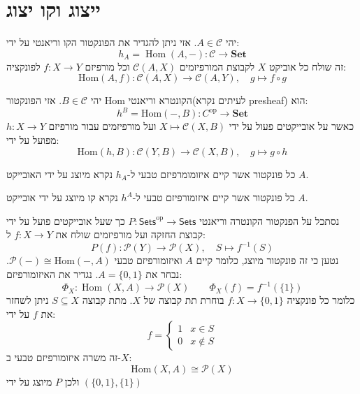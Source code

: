 \documentclass{tstextbook}
\begin{document}
\section{ייצוג וקו יצוג}

\begin{definition}
יהי \(A \in \mathcal{C}\). אזי ניתן להגדיר את הפונקטור הקו וריאנטי על ידי:
$$h_{A}=\operatorname{Hom}(A,-)\colon{\mathcal{C}}\to\mathbf{Set}$$
זה שולח כל אוביקט \(X\) לקבוצת המורפיזמים \(\mathcal{C}(A,X)\) וכל מורפיזם \(f:X\to Y\) לפונקציה:
$$\mathrm{Hom}(A,f)\colon{\mathcal{C}}(A,X)\to{\mathcal{C}}(A,Y),\quad g\mapsto f\circ g$$

\end{definition}
\begin{definition}
יהי \(B \in \mathcal{C}\). אזי הפונקטור Hom הקונטרא וריאנטי(לעיתים נקרא presheaf) הוא:
$$h^{B}=\mathrm{Hom}(-,B)\colon C^{\mathrm{op}}\to\mathbf{Set}$$
כאשר על אובייקטים פעול על ידי \(X\mapsto \mathcal{C}(X,B)\) ועל מורפיזמים עבור מורפיזם \(h:X\to Y\) מפועל על ידי:
$$\mathrm{Hom}(h,B)\colon{\mathcal{C}}(Y,B)\to{\mathcal{C}}(X,B),\quad g\mapsto g\circ h$$

\end{definition}
\begin{proposition}
כל פונקטור אשר קיים איזומומרפיזם טבעי ל-\(h_{A}\) נקרא מיוצג על ידי האובייקט \(A\).

\end{proposition}
\begin{proposition}
כל פונקטור אשר קיים איזומורפיזם טבעי ל-\(h^{A}\) נקרא קו מיוצג על ידי אובייקט \(A\).

\end{proposition}
\begin{example}
נסתכל על הפנקטור הקונטרה וריאנטי \(P:\mathsf{Sets}^{\mathrm{op}}\to \mathsf{Sets}\) כך שעל אובייקטים פועל על ידי קבוצת החזקה ועל מורפיזמים שולח את \(f:X\to Y\) ל:
$$P(f):{\mathcal{P}}(Y)\to{\mathcal{P}}(X),\quad S\mapsto f^{-1}(S)$$
נטען כי זה פונקטור מיוצג, כלומר קיים \(A\) ואיזומורפיזם טבעי \(\mathcal{P}(-)\cong \mathrm{Hom}(-,A)\). נבחר את \(A=\{ 0,1 \}\). נגדיר את האיזומורפיזם:
$$\Phi_{X}\colon\operatorname{Hom}(X,A)\longrightarrow{\mathcal{P}}(X)\qquad \Phi_{X}(f)=f^{-1}(\{1\})$$
כלומר כל פונקציה \(f:X\to \{ 0,1 \}\) בוחרת תת קבוצה של \(X\). מתת קבוצה \(S\subseteq X\) ניתן לשחזר את \(f\) על ידי:
$$f=\begin{cases}1 & x \in S \\0 & x \not \in S
\end{cases}$$
זה משרה איזומורפיזם טבעי ב-\(X\):
$${\mathrm{Hom}}(X,A)\cong{\mathcal{P}}(X)$$
ולכן \(P\) מיוצג על ידי \(\left( \{ 0,1 \},\{ 1 \} \right)\)

\end{example}
\end{document}
